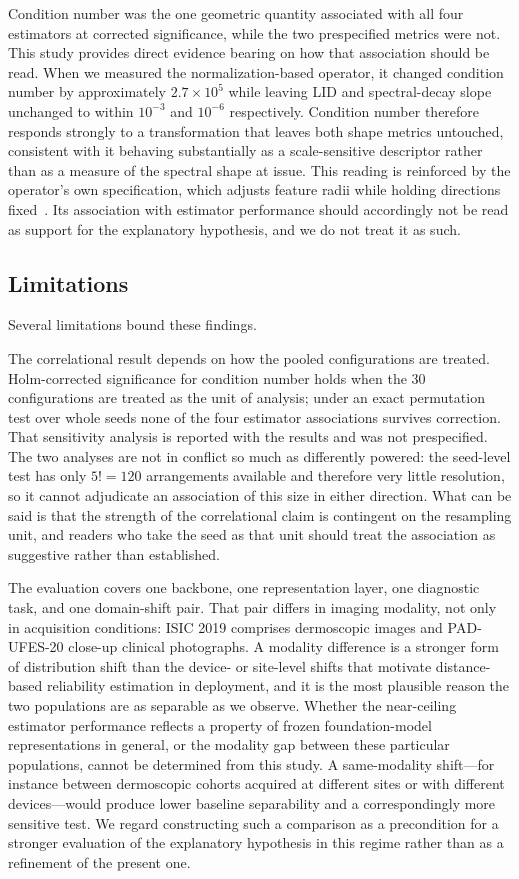 Condition number was the one geometric quantity associated with all four
estimators at corrected significance, while the two prespecified metrics
were not. This study provides direct evidence bearing on how that association
should be read. When we measured the normalization-based operator, it changed
condition number by approximately $2.7\times10^{5}$ while leaving LID and
spectral-decay slope unchanged to within $10^{-3}$ and $10^{-6}$
respectively. Condition number therefore responds strongly to a
transformation that leaves both shape metrics untouched, consistent with it
behaving substantially as a scale-sensitive descriptor rather than as a
measure of the spectral shape at issue. This reading is reinforced by the
operator's own specification, which adjusts feature radii while holding
directions fixed~\cite{yu2510dissecting}. Its association with estimator
performance should accordingly not be read as support for the explanatory
hypothesis, and we do not treat it as such.

\subsection{Limitations}

Several limitations bound these findings.

The correlational result depends on how the pooled configurations are treated.
Holm-corrected significance for condition number holds when the $30$
configurations are treated as the unit of analysis; under an exact permutation
test over whole seeds none of the four estimator associations survives
correction. That sensitivity analysis is reported with the results and was not
prespecified. The two analyses are not in conflict so much as differently
powered: the seed-level test has only $5! = 120$ arrangements available and
therefore very little resolution, so it cannot adjudicate an association of this
size in either direction. What can be said is that the strength of the
correlational claim is contingent on the resampling unit, and readers who take
the seed as that unit should treat the association as suggestive rather than
established.

The evaluation covers one backbone, one representation layer, one diagnostic
task, and one domain-shift pair. That pair differs in imaging modality, not
only in acquisition conditions: ISIC 2019 comprises dermoscopic images and
PAD-UFES-20 close-up clinical photographs. A modality difference is a
stronger form of distribution shift than the device- or site-level shifts
that motivate distance-based reliability estimation in deployment, and it is
the most plausible reason the two populations are as separable as we observe.
Whether the near-ceiling estimator performance reflects a property of frozen
foundation-model representations in general, or the modality gap between
these particular populations, cannot be determined from this study. A
same-modality shift---for instance between dermoscopic cohorts acquired at
different sites or with different devices---would produce lower baseline
separability and a correspondingly more sensitive test. We regard
constructing such a comparison as a precondition for a stronger evaluation of
the explanatory hypothesis in this regime rather than as a refinement of the
present one.

